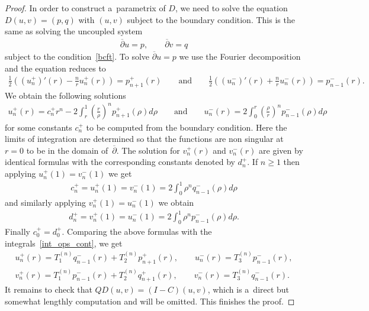 \documentclass[11pt]{article}
\numberwithin{equation}{section}
\begin{document}
\begin{proof}
In order to construct a~parametrix of $D$, we need to solve the equation $D(u,v) = (p,q)$ with $(u,v)$ subject to the
boundary condition.
This is the same as solving the uncoupled system
\begin{gather*}
\overline{\partial}u = p,
\qquad
\overline{\partial}v = q
\end{gather*}
subject to the condition~\eqref{bcft}.
To solve $\overline{\partial}u=p$ we use the Fourier decomposition and the equation reduces to
\begin{gather*}
\frac{1}{2}\left((u_n^+)'(r) - \frac{n}{r}u_n^+(r)\right) = p_{n+1}^+(r)
\qquad
\textrm{and}
\qquad
\frac{1}{2}\left((u_n^-)'(r) + \frac{n}{r}u_n^-(r)\right) = p_{n-1}^-(r).
\end{gather*}
We obtain the following solutions
\begin{gather*}
u_n^+(r) = c_n^+ r^n - 2\int_{r}^{1} \left(\frac{r}{\rho}\right)^n p_{n+1}^+(\rho)d \rho
\qquad
\textrm{and}
\qquad
u_n^-(r) = 2\int_{0}^{r} \left(\frac{\rho}{r}\right)^n p_{n-1}^-(\rho)d \rho
\end{gather*}
for some constants $c_n^+$ to be computed from the boundary condition.
Here the limits of integration are determined so that the functions are non singular at $r=0$ to be in the domain of~$\overline{\partial}$.
The solution for $v_n^+(r)$ and $v_n^-(r)$ are given by identical formulas with the corresponding constants denoted by
$d_n^+$.
If $n\ge1$ then applying $u_n^+(1) = v_n^-(1)$ we get
\begin{gather*}
c_n^+ = u_n^+(1) = v_n^-(1) = 2\int_0^1 \rho^n q_{n-1}^-(\rho)d\rho
\end{gather*}
and similarly applying $v_n^+(1) = u_n^-(1)$ we obtain
\begin{gather*}
d_n^+ = v_n^+(1) = u_n^-(1) = 2\int_0^1 \rho^n p_{n-1}^-(\rho)d\rho.
\end{gather*}
Finally $c_0^+=d_0^+$.
Comparing the above formulas with the integrals~\eqref{int_ops_cont}, we get
\begin{gather*}
u_n^+(r) = T_1^{(n)}q_{n-1}^-(r) + T_2^{(n)}p_{n+1}^+(r),
\qquad
u_n^-(r) = T_3^{(n)}p_{n-1}^-(r),
\\
v_n^+(r) = T_1^{(n)}p_{n-1}^-(r) + T_2^{(n)}q_{n+1}^+(r),
\qquad
v_n^-(r) = T_3^{(n)}q_{n-1}^-(r).
\end{gather*}
It remains to check that $QD(u,v) = (I-C)(u,v)$, which is a~direct but somewhat lengthly computation and will be
omitted.
This f\/inishes the proof.
\end{proof}
\end{document}
